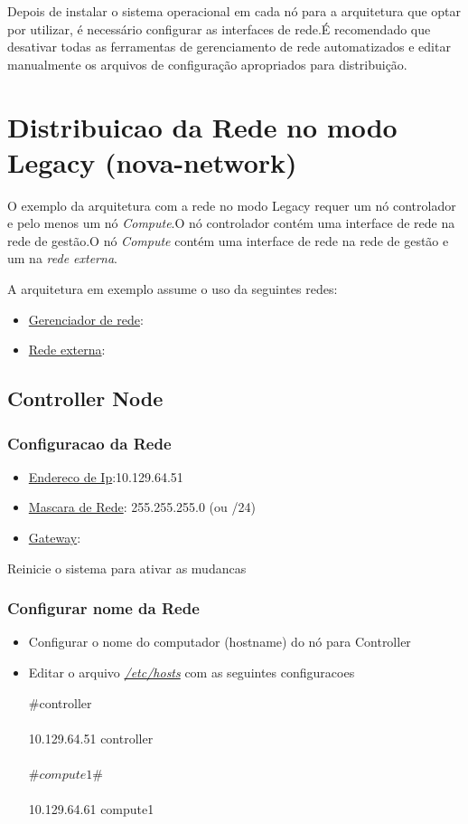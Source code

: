 \documentclass[a4paper]{book}
\begin{document}
		Depois de instalar o sistema operacional em cada nó para a arquitetura que optar por utilizar, é necessário configurar as interfaces de rede.É recomendado que desativar todas as ferramentas de gerenciamento de rede automatizados e editar manualmente os arquivos de configuração apropriados para distribuição.
		
		\section{Distribuicao da Rede no modo Legacy (nova-network)}
		O exemplo da arquitetura com a rede no modo Legacy requer um nó controlador e pelo menos um nó \emph{Compute}.O nó controlador contém uma interface de rede na rede de gestão.O nó \emph{Compute} contém uma interface de rede na rede de gestão e um na \emph{rede externa}.
		
		A arquitetura em exemplo assume o uso da seguintes redes:
		\begin{itemize}
			\item \underline{Gerenciador de rede}: 
			\item \underline{Rede externa}:
		\end{itemize}
		
		
		\subsection{Controller Node}
			\subsubsection{Configuracao da Rede}
			\begin{itemize}
				\item \underline{Endereco de Ip}:10.129.64.51
				\item \underline{Mascara de Rede}: 255.255.255.0 (ou /24)
				\item \underline{Gateway}:
			\end{itemize}
			Reinicie o sistema para ativar as mudancas
			
			\subsubsection{Configurar nome da Rede}
			\begin{itemize}
				\item Configurar o nome do computador (hostname) do nó para Controller
				\item Editar o arquivo \emph{\underline{/etc/hosts}} com as seguintes 						configuracoes 
				
					\begin{snugshade}
						$\#$controller \\  \\
						10.129.64.51 		controller \\ \\
						\#$compute1$\#		\\ \\
						10.129.64.61		compute1\\
					\end{snugshade}
			\end{itemize}
			
\end{document}
